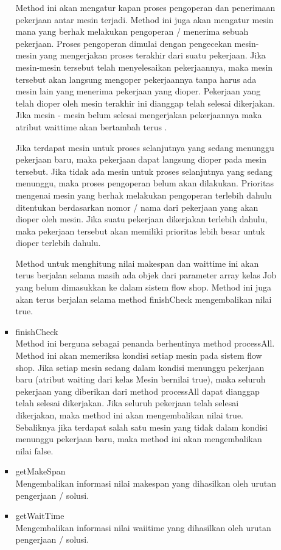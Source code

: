 \begin{itemize}
\begin{itemize}
\begin{itemize}
				Method ini akan mengatur kapan proses pengoperan dan penerimaan pekerjaan antar
				mesin terjadi. Method ini juga akan mengatur mesin mana yang berhak melakukan
				pengoperan / menerima sebuah pekerjaan. Proses pengoperan dimulai dengan pengecekan
				mesin-mesin yang mengerjakan proses terakhir dari suatu pekerjaan. Jika
				mesin-mesin tersebut telah menyelesaikan pekerjaannya, maka mesin tersebut akan
				langsung mengoper pekerjaannya tanpa harus ada mesin lain yang menerima pekerjaan
				yang dioper. Pekerjaan yang telah dioper oleh mesin terakhir ini dianggap telah
				selesai dikerjakan. Jika mesin - mesin belum selesai mengerjakan pekerjaannya maka atribut 
				waittime akan bertambah terus . 
				
				Jika terdapat mesin untuk proses selanjutnya yang sedang menunggu pekerjaan baru,
				maka pekerjaan dapat langsung dioper pada mesin tersebut. Jika tidak ada
				mesin untuk proses selanjutnya yang sedang menunggu, maka proses pengoperan
				belum akan dilakukan. Prioritas mengenai mesin yang berhak melakukan pengoperan
				terlebih dahulu ditentukan berdasarkan nomor / nama dari pekerjaan yang akan
				dioper oleh mesin. Jika suatu pekerjaan dikerjakan terlebih dahulu, maka pekerjaan
				tersebut akan memiliki prioritas lebih besar untuk dioper terlebih dahulu.
				
			    Method untuk menghitung nilai makespan dan waittime ini akan terus 
				berjalan selama	masih ada objek dari parameter array kelas Job yang belum dimasukkan ke dalam
				sistem flow shop. Method ini juga akan terus berjalan selama method finishCheck
				mengembalikan nilai true.
				\item finishCheck\\
				Method ini berguna sebagai penanda berhentinya method processAll. Method
				ini akan memeriksa kondisi setiap mesin pada sistem flow shop. Jika setiap
				mesin sedang dalam kondisi menunggu pekerjaan baru (atribut waiting dari kelas
				Mesin bernilai true), maka seluruh pekerjaan yang diberikan dari method processAll
				dapat dianggap telah selesai dikerjakan. Jika seluruh pekerjaan telah selesai
				dikerjakan, maka method ini akan mengembalikan nilai true. Sebaliknya jika terdapat
				salah satu mesin yang tidak dalam kondisi menunggu pekerjaan baru, maka
				method ini akan mengembalikan nilai false.
				\item getMakeSpan \\ 
				Mengembalikan informasi nilai makespan yang dihasilkan oleh urutan pengerjaan /
				solusi.
				\item getWaitTime \\
				Mengembalikan informasi nilai waiitime yang dihasilkan oleh urutan pengerjaan /
				solusi.
			\end{itemize}
		\end{itemize}
		

\end{itemize}
